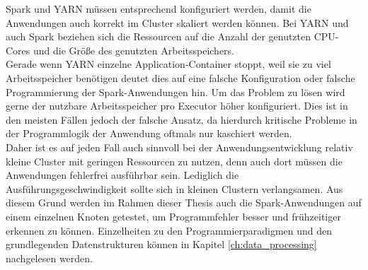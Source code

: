 \noindent
Spark und YARN müssen entsprechend konfiguriert werden, damit die Anwendungen auch korrekt im Cluster skaliert werden können. 
Bei YARN und auch Spark beziehen sich die Ressourcen auf die Anzahl der genutzten CPU-Cores
und die Größe des genutzten Arbeitsspeichers.\\
Gerade wenn YARN einzelne Application-Container stoppt, weil sie zu viel Arbeitsspeicher benötigen deutet dies auf eine falsche Konfiguration oder falsche Programmierung der Spark-Anwendungen hin. Um das Problem zu lösen wird gerne der nutzbare Arbeitsspeicher pro Executor höher konfiguriert. Dies ist in den meisten Fällen jedoch der falsche Ansatz, da hierdurch kritische Probleme in der Programmlogik der Anwendung oftmals  nur kaschiert werden.\\ Daher ist es auf jeden Fall auch sinnvoll bei der Anwendungsentwicklung relativ kleine Cluster mit geringen Ressourcen zu nutzen, denn auch dort müssen die Anwendungen fehlerfrei ausführbar sein. Lediglich die Ausführungsgeschwindigkeit sollte sich in kleinen Clustern verlangsamen. Aus diesem Grund werden im Rahmen dieser Thesis auch die Spark-Anwendungen auf einem einzelnen Knoten getestet, um Programmfehler besser und frühzeitiger erkennen zu können. Einzelheiten zu den Programmierparadigmen und den grundlegenden Datenstrukturen können in Kapitel \ref{ch:data_processing} nachgelesen werden.


